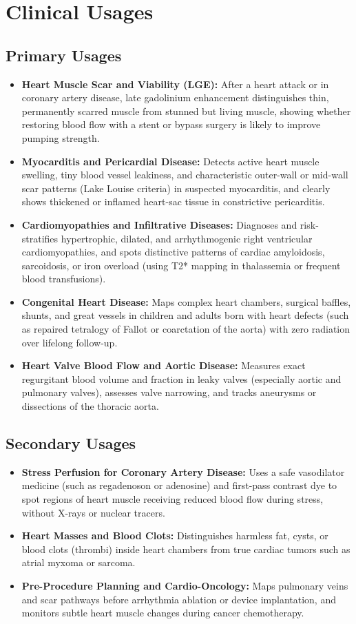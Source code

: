 \section{Clinical Usages}

\subsection{Primary Usages}
\begin{itemize}
\item \textbf{Heart Muscle Scar and Viability (LGE):} After a heart attack or in coronary artery disease, late gadolinium enhancement distinguishes thin, permanently scarred muscle from stunned but living muscle, showing whether restoring blood flow with a stent or bypass surgery is likely to improve pumping strength.
\item \textbf{Myocarditis and Pericardial Disease:} Detects active heart muscle swelling, tiny blood vessel leakiness, and characteristic outer-wall or mid-wall scar patterns (Lake Louise criteria) in suspected myocarditis, and clearly shows thickened or inflamed heart-sac tissue in constrictive pericarditis.
\item \textbf{Cardiomyopathies and Infiltrative Diseases:} Diagnoses and risk-stratifies hypertrophic, dilated, and arrhythmogenic right ventricular cardiomyopathies, and spots distinctive patterns of cardiac amyloidosis, sarcoidosis, or iron overload (using T2* mapping in thalassemia or frequent blood transfusions).
\item \textbf{Congenital Heart Disease:} Maps complex heart chambers, surgical baffles, shunts, and great vessels in children and adults born with heart defects (such as repaired tetralogy of Fallot or coarctation of the aorta) with zero radiation over lifelong follow-up.
\item \textbf{Heart Valve Blood Flow and Aortic Disease:} Measures exact regurgitant blood volume and fraction in leaky valves (especially aortic and pulmonary valves), assesses valve narrowing, and tracks aneurysms or dissections of the thoracic aorta.
\end{itemize}

\subsection{Secondary Usages}
\begin{itemize}
\item \textbf{Stress Perfusion for Coronary Artery Disease:} Uses a safe vasodilator medicine (such as regadenoson or adenosine) and first-pass contrast dye to spot regions of heart muscle receiving reduced blood flow during stress, without X-rays or nuclear tracers.
\item \textbf{Heart Masses and Blood Clots:} Distinguishes harmless fat, cysts, or blood clots (thrombi) inside heart chambers from true cardiac tumors such as atrial myxoma or sarcoma.
\item \textbf{Pre-Procedure Planning and Cardio-Oncology:} Maps pulmonary veins and scar pathways before arrhythmia ablation or device implantation, and monitors subtle heart muscle changes during cancer chemotherapy.
\end{itemize}

